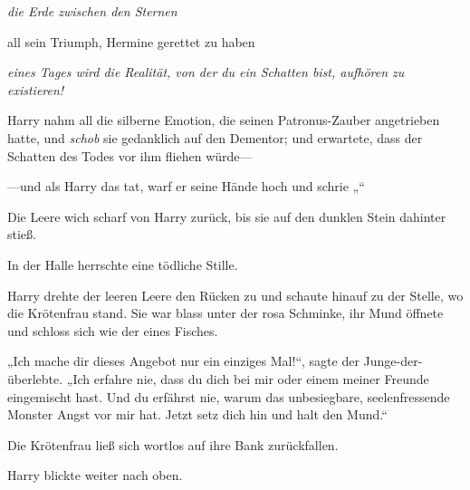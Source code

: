 \emph{die Erde zwischen den Sternen}

all sein Triumph, Hermine gerettet zu haben

\emph{eines Tages wird die Realität, von der du ein Schatten bist, aufhören zu existieren!}

Harry nahm all die silberne Emotion, die seinen Patronus-Zauber angetrieben hatte, und \emph{schob} sie gedanklich auf den Dementor; und erwartete, dass der Schatten des Todes vor ihm fliehen würde—

—und als Harry das tat, warf er seine Hände hoch und schrie „“

Die Leere wich scharf von Harry zurück, bis sie auf den dunklen Stein dahinter stieß.

In der Halle herrschte eine tödliche Stille.

Harry drehte der leeren Leere den Rücken zu und schaute hinauf zu der Stelle, wo die Krötenfrau stand. Sie war blass unter der rosa Schminke, ihr Mund öffnete und schloss sich wie der eines Fisches.

„Ich mache dir dieses Angebot nur ein einziges Mal!“, sagte der Junge-der-überlebte. „Ich erfahre nie, dass du dich bei mir oder einem meiner Freunde eingemischt hast. Und du erfährst nie, warum das unbesiegbare, seelenfressende Monster Angst vor mir hat. Jetzt setz dich hin und halt den Mund.“

Die Krötenfrau ließ sich wortlos auf ihre Bank zurückfallen.

Harry blickte weiter nach oben.

